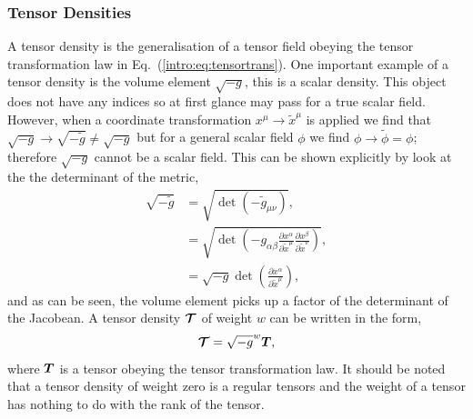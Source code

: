 \subsubsection{Tensor Densities}
A tensor density is the generalisation of a tensor field obeying the tensor transformation law in Eq.~(\ref{intro:eq:tensortrans}). One important example of a tensor density is the volume element $\sqrt{-g}$, this is a scalar density. This object does not have any indices so at first glance may pass for a true scalar field. However, when a coordinate transformation $x^\mu \rightarrow \tilde{x}^\mu$ is applied we find that $\sqrt{-g} \rightarrow \sqrt{-\tilde{g}} \neq \sqrt{-g}$ but for a general scalar field $\phi$ we find $\phi \rightarrow \tilde{\phi} = \phi$; therefore $\sqrt{-g}$ cannot be a scalar field. This can be shown explicitly by look at the the determinant of the metric,
\begin{align}
\sqrt{-\tilde{g}} &= \sqrt{\det(-\tilde{g}_{\mu\nu})},\\
&= \sqrt{\det\left(-g_{\alpha \beta} \frac{\partial x^\alpha}{\partial \tilde{x}^\mu}  \frac{\partial x^\beta}{\partial \tilde{x}^\nu} \right)} ,\\
&= \sqrt{-g} \det\left(\frac{\partial x^\alpha}{\partial \tilde{x}^\mu}\right)\label{intro:eq:rootgtrans},
\end{align}
and as can be seen, the volume element picks up a factor of the determinant of the Jacobean. A tensor density $\boldsymbol{\mathcal{T}}$ of weight $w$ can be written in the form, 
\begin{equation}\boldsymbol{\mathcal{T}} = \sqrt{-g}^w\boldsymbol{T},\end{equation}
 where $\boldsymbol{T}$ is a tensor obeying the tensor transformation law. It should be noted that a tensor density of weight zero is a regular tensors and the weight of a tensor has nothing to do with the rank of the tensor.



